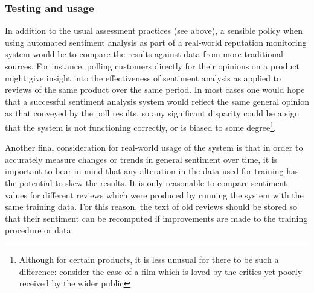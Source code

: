 \documentclass[11pt]{article}
\begin{document}

\subsubsection*{Testing and usage}
In addition to the usual assessment practices (see above), a sensible policy
when using automated sentiment analysis as part of a real-world reputation
monitoring system would be to compare the results against data from more
traditional sources. For instance, polling customers directly for their
opinions on a product might give insight into the effectiveness of sentiment
analysis as applied to reviews of the same product over the same period. In
most cases one would hope that a successful sentiment analysis system would
reflect the same general opinion as that conveyed by the poll results, so any
significant disparity could be a sign that the system is not functioning
correctly, or is biased to some degree\footnote{Although for certain products,
it is less unusual for there to be such a difference: consider the case of a
film which is loved by the critics yet poorly received by the wider public}.

Another final consideration for real-world usage of the system is that in order
to accurately measure changes or trends in general sentiment over time, it is
important to bear in mind that any alteration in the data used for training has
the potential to skew the results. It is only reasonable to compare sentiment
values for different reviews which were produced by running the system with the
same training data. For this reason, the text of old reviews should be stored
so that their sentiment can be recomputed if improvements are made to the
training procedure or data.

{}

\end{document}
